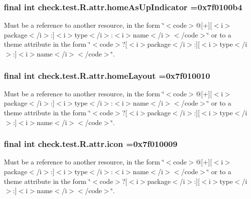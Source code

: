 \subsubsection[{home\+As\+Up\+Indicator}]{\setlength{\rightskip}{0pt plus 5cm}final int check.\+test.\+R.\+attr.\+home\+As\+Up\+Indicator =0x7f0100b4\hspace{0.3cm}{\ttfamily [static]}}\label{classcheck_1_1test_1_1_r_1_1attr_a337a62ef9d44c64d88a4136aca1a5d52}
Must be a reference to another resource, in the form \char`\"{}$<$code$>$@\mbox{[}+\mbox{]}\mbox{[}$<$i$>$package$<$/i$>$\+:\mbox{]}$<$i$>$type$<$/i$>$\+:$<$i$>$name$<$/i$>$$<$/code$>$\char`\"{} or to a theme attribute in the form \char`\"{}$<$code$>$?\mbox{[}$<$i$>$package$<$/i$>$\+:\mbox{]}\mbox{[}$<$i$>$type$<$/i$>$\+:\mbox{]}$<$i$>$name$<$/i$>$$<$/code$>$\char`\"{}. \hypertarget{classcheck_1_1test_1_1_r_1_1attr_a2ea41d239ed9fa5e737ac3d46fa3c567}{}
\subsubsection[{home\+Layout}]{\setlength{\rightskip}{0pt plus 5cm}final int check.\+test.\+R.\+attr.\+home\+Layout =0x7f010010\hspace{0.3cm}{\ttfamily [static]}}\label{classcheck_1_1test_1_1_r_1_1attr_a2ea41d239ed9fa5e737ac3d46fa3c567}
Must be a reference to another resource, in the form \char`\"{}$<$code$>$@\mbox{[}+\mbox{]}\mbox{[}$<$i$>$package$<$/i$>$\+:\mbox{]}$<$i$>$type$<$/i$>$\+:$<$i$>$name$<$/i$>$$<$/code$>$\char`\"{} or to a theme attribute in the form \char`\"{}$<$code$>$?\mbox{[}$<$i$>$package$<$/i$>$\+:\mbox{]}\mbox{[}$<$i$>$type$<$/i$>$\+:\mbox{]}$<$i$>$name$<$/i$>$$<$/code$>$\char`\"{}. \hypertarget{classcheck_1_1test_1_1_r_1_1attr_a6cc6cb2d226afebb2e5d8eeb8175ad45}{}
\subsubsection[{icon}]{\setlength{\rightskip}{0pt plus 5cm}final int check.\+test.\+R.\+attr.\+icon =0x7f010009\hspace{0.3cm}{\ttfamily [static]}}\label{classcheck_1_1test_1_1_r_1_1attr_a6cc6cb2d226afebb2e5d8eeb8175ad45}
Must be a reference to another resource, in the form \char`\"{}$<$code$>$@\mbox{[}+\mbox{]}\mbox{[}$<$i$>$package$<$/i$>$\+:\mbox{]}$<$i$>$type$<$/i$>$\+:$<$i$>$name$<$/i$>$$<$/code$>$\char`\"{} or to a theme attribute in the form \char`\"{}$<$code$>$?\mbox{[}$<$i$>$package$<$/i$>$\+:\mbox{]}\mbox{[}$<$i$>$type$<$/i$>$\+:\mbox{]}$<$i$>$name$<$/i$>$$<$/code$>$\char`\"{}. \hypertarget{classcheck_1_1test_1_1_r_1_1attr_aeb43240baae0ba0739bca74fbbd9e646}{}
